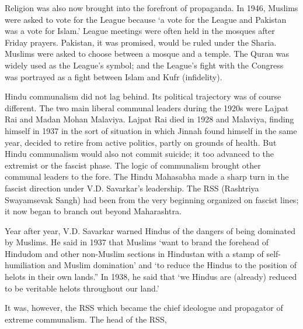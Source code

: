 Religion was also now brought into the forefront of propaganda. In 1946, Muslims were asked to vote for the League because ‘a vote for the League and Pakistan was a vote for Islam.’ League meetings were often held in the mosques after Friday prayers. Pakistan, it was promised, would be ruled under the Sharia. Muslims were asked to choose between a mosque and a temple. The Quran was widely used as the League’s symbol; and the League’s fight with the Congress was portrayed as a fight between Islam and Kufr (infidelity). 

Hindu communalism did not lag behind. Its political trajectory was of course different. The two main liberal communal leaders during the 1920s were Lajpat Rai and Madan Mohan Malaviya. Lajpat Rai died in 1928 and Malaviya, finding himself in 1937 in the sort of situation in which Jinnah found himself in the same year, decided to retire from active politics, partly on grounds of health. But Hindu communalism would also not commit suicide; it too advanced to the extremist or the fascist phase. The logic of communalism brought other communal leaders to the fore. The Hindu Mahasabha made a sharp turn in the fascist direction under V.D. Savarkar’s leadership. The RSS (Rashtriya Swayamsevak Sangh) had been from the very beginning organized on fascist lines; it now began to branch out beyond Maharashtra. 

Year after year, V.D. Savarkar warned Hindus of the dangers of being dominated by Muslims. He said in 1937 that Muslims ‘want to brand the forehead of Hindudom and other non-Muslim sections in Hindustan with a stamp of self- humiliation and Muslim domination’ and ‘to reduce the Hindus to the position of helots in their own lands.” In 1938, he said that ‘we Hindus are (already) reduced to be veritable helots throughout our land.’ 

It was, however, the RSS which became the chief ideologue and propagator of extreme communalism. The head of the RSS, 


